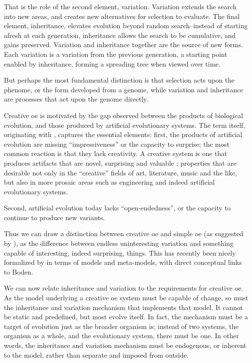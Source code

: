 That is the role of the second element, variation. Variation extends the search into new areas, and creates new alternatives for selection to evaluate. The final element, inheritance, elevates evolution beyond random search--instead of starting afresh at each generation, inheritance allows the search to be cumulative, and gains preserved. Variation and inheritance together are the source of new forms. Each variation is a variation from the previous generation, a starting point enabled by inheritance, forming a spreading tree when viewed over time. 

But perhaps the most fundamental distinction is that selection acts upon the phenome, or the form developed from a genome, while variation and inheritance are processes that act upon the genome directly.

Creative \gls{oe} is motivated by the gap observed between the products of biological evolution, and those produced by artificial evolutionary systems. The term itself, originating with \textcite{Taylor2001}, captures the essential elements: first, the products of artificial evolution are missing ``impressiveness'' or the capacity to surprise; the most common reaction is that they lack creativity. A creative system is one that produces artifacts that are novel, surprising and valuable \parencite{Boden2004}; properties that are desirable not only in the ``creative'' fields of art, literature, music and the like, but also in more prosaic areas such as engineering and indeed artificial evolutionary systems. 

Second, artificial evolution today lacks ``open-endedness'', or the capacity to continue to produce new variants.

Thus we can draw a distinction between creative \gls{oe} and simple \gls{oe} (as suggested by \textcite{Taylor2001}), as the difference between endless uninteresting variation and something capable of interesting, indeed surprising, things. This has recently been nicely formalized by \textcite{BanzhafBaumgaertnerBeslonEtAl2016} in terms of models and meta-models, with direct conceptual links to Boden. 

We can now relate inheritance and variation to the requirements for creative \gls{oe}. As the model underlying a creative \gls{oe} system must be capable of change, so must the inheritance and variation mechanism that implements that model. It cannot be static and predefined, but most evolve itself. In fact, the mechanism must be a target of evolution just as the broader organism is; instead of two systems, the organism as a whole, and the evolutionary system, there must be one. In other words, the inheritance and variation mechanism must be endogenous, or inherent to the model, rather than separate and imposed from outside.

